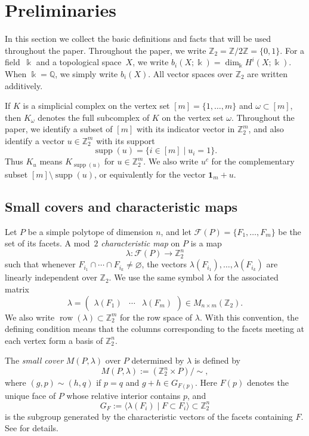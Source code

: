 \documentclass{amsart}
\numberwithin{equation}{section}
\theoremstyle{definition}
\theoremstyle{remark}
\newcommand{\Z}{\mathbb Z}
\newcommand{\Q}{\mathbb Q}
\newcommand{\cF}{\mathcal F}
\newcommand{\one}{\mathbf 1}
\newcommand{\field}{\Bbbk}
\DeclareMathOperator{\supp}{supp}
\DeclareMathOperator{\row}{row}
\begin{document}
\section{Preliminaries}\label{sec-preliminaries}

In this section we collect the basic definitions and facts that will be used throughout the paper.
Throughout the paper, we write $\Z_2=\Z/2\Z=\{0,1\}$.
For a field~$\field$ and a topological space~$X$, we write $b_i(X;\field)=\dim_\field H^i(X; \field)$.
When $\field=\Q$, we simply write $b_i(X)$.
All vector spaces over $\Z_2$ are written additively.

If $K$ is a simplicial complex on the vertex set $[m]=\{1,\dots,m\}$ and $\omega\subset [m]$, then $K_\omega$ denotes the full subcomplex of $K$
on the vertex set $\omega$.
Throughout the paper, we identify a subset of $[m]$ with its indicator vector in $\Z_2^m$, and also identify a vector $u\in\Z_2^m$ with its support
$$
    \supp(u)=\{i\in [m]\mid u_i=1\}.
$$
Thus $K_u$ means $K_{\supp(u)}$ for $u\in\Z_2^m$.
We also write $u^c$ for the complementary subset $[m]\setminus\supp(u)$, or equivalently for the vector $\one_m+u$.



\subsection{Small covers and characteristic maps} \label{subsec:smallcover}
Let $P$ be a simple polytope of dimension $n$, and let $\cF(P)=\{F_1,\dots,F_m\}$ be the set of its facets.
A mod~$2$ \emph{characteristic map} on $P$ is a map
$$
    \lambda \colon \cF(P)\to \Z_2^n
$$
such that whenever $F_{i_1}\cap \cdots\cap F_{i_k}\neq \varnothing$, the vectors $\lambda(F_{i_1}),\dots,\lambda(F_{i_k})$ are linearly independent over $\Z_2$.
We use the same symbol $\lambda$ for the associated matrix
$$
    \lambda= \begin{pmatrix} \lambda(F_1) & \cdots & \lambda(F_m) \end{pmatrix} \in M_{n\times m}(\Z_2).
$$
We also write $\row(\lambda)\subset \Z_2^m$ for the row space of $\lambda$.
With this convention, the defining condition means that the columns corresponding to the facets meeting at each vertex form a basis of $\Z_2^n$.

The \emph{small cover} $M(P,\lambda)$ over $P$ determined by $\lambda$ is defined by
$$
    M(P,\lambda):=(\Z_2^n\times P)/\sim,
$$
where $(g,p)\sim (h,q)$ if $p=q$ and $g+h\in G_{F(p)}$.
Here $F(p)$ denotes the unique face of $P$ whose relative interior contains $p$, and
$$
    G_{F}:=\langle \lambda(F_i)\mid F\subset F_i\rangle \subset \Z_2^n
$$
is the subgroup generated by the characteristic vectors of the facets containing $F$.
See \cite{Davis-Januszkiewicz1991} for details.
\end{document}

